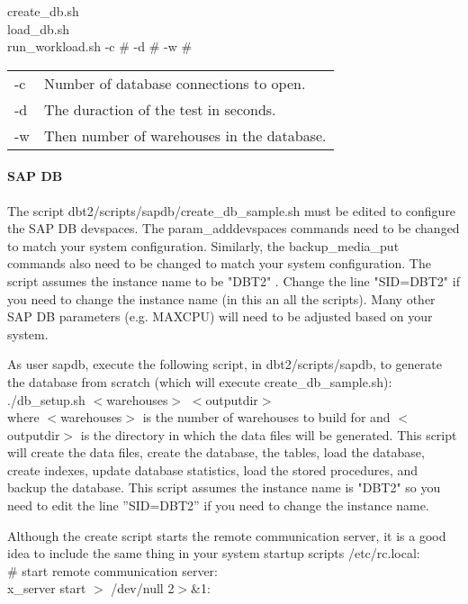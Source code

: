 \documentclass{article}
\begin{document}
\indent create\_db.sh \\
\indent load\_db.sh \\
\indent run\_workload.sh -c \# -d \# -w \# \\
\begin{tabular}[c]{ll}
-c	& Number of database connections to open. \\
-d	& The duraction of the test in seconds. \\
-w	& Then number of warehouses in the database. \\
\end{tabular}

\paragraph{SAP DB}

The script dbt2/scripts/sapdb/create\_db\_sample.sh must be edited to
configure the SAP DB devspaces.  The param\_adddevspaces commands need to be
changed to match your system configuration.  Similarly, the backup\_media\_put
commands also need to be changed to match your system configuration.  The
script assumes the instance name to be "DBT2" .  Change the line "SID=DBT2"
if you need to change the instance name (in this an all the scripts).  Many
other SAP DB parameters (e.g. MAXCPU) will need to be adjusted based on your
system.

\noindent
As user sapdb, execute the following script, in dbt2/scripts/sapdb, to
generate the database from scratch (which will execute
create\_db\_sample.sh): \\
\indent ./db\_setup.sh $<$warehouses$>$ $<$outputdir$>$ \\
where $<$warehouses$>$ is the number of warehouses to build for and
$<$outputdir$>$ is the directory in which the data files will be generated.
This script will create the data files, create the database, the tables, load
the database, create indexes, update database statistics, load the stored
procedures, and backup the database.  This script assumes the instance name is
"DBT2" so you need to edit the line ''SID=DBT2'' if you need to change the
instance name.

\noindent
Although the create script starts the remote communication server, it is a
good idea to include the same thing in your system startup scripts
/etc/rc.local: \\
\indent \# start remote communication server: \\
\indent x\_server start $>$ /dev/null 2$>$\&1:
\end{document}
